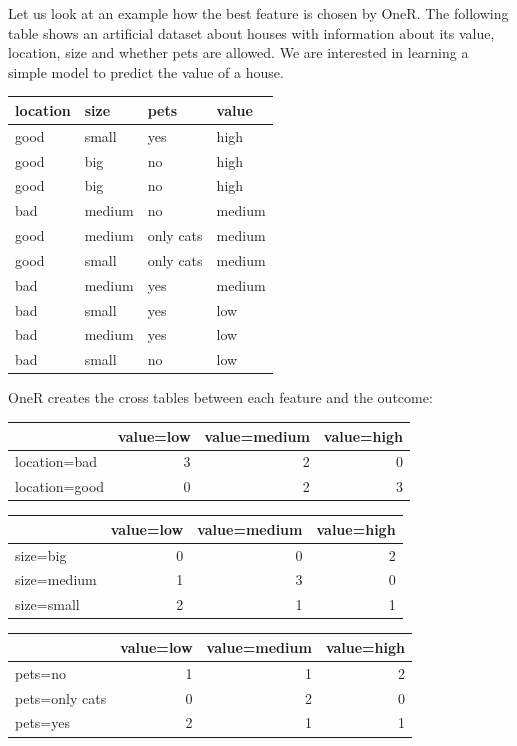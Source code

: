 \documentclass[12pt,]{krantz}
\begin{document}
Let us look at an example how the best feature is chosen by OneR. The
following table shows an artificial dataset about houses with
information about its value, location, size and whether pets are
allowed. We are interested in learning a simple model to predict the
value of a house.

\begin{tabular}{l|l|l|l}
\hline
location & size & pets & value\\
\hline
good & small & yes & high\\
\hline
good & big & no & high\\
\hline
good & big & no & high\\
\hline
bad & medium & no & medium\\
\hline
good & medium & only cats & medium\\
\hline
good & small & only cats & medium\\
\hline
bad & medium & yes & medium\\
\hline
bad & small & yes & low\\
\hline
bad & medium & yes & low\\
\hline
bad & small & no & low\\
\hline
\end{tabular}

OneR creates the cross tables between each feature and the outcome:

\begin{tabular}{l|r|r|r}
\hline
  & value=low & value=medium & value=high\\
\hline
location=bad & 3 & 2 & 0\\
\hline
location=good & 0 & 2 & 3\\
\hline
\end{tabular}

\begin{tabular}{l|r|r|r}
\hline
  & value=low & value=medium & value=high\\
\hline
size=big & 0 & 0 & 2\\
\hline
size=medium & 1 & 3 & 0\\
\hline
size=small & 2 & 1 & 1\\
\hline
\end{tabular}

\begin{tabular}{l|r|r|r}
\hline
  & value=low & value=medium & value=high\\
\hline
pets=no & 1 & 1 & 2\\
\hline
pets=only cats & 0 & 2 & 0\\
\hline
pets=yes & 2 & 1 & 1\\
\hline
\end{tabular}
\end{document}
